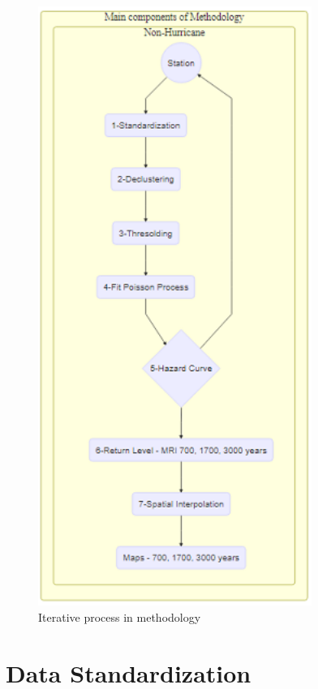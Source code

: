 \documentclass[12pt,oneside]{reedthesis}
\begin{document}
\footnotesize
\begin{figure}

{\centering \includegraphics[width=3.51in]{figure/main_methodology} 

}

\caption{Iterative process in methodology}\label{fig:mainmethodology}
\end{figure}
\normalsize

\hypertarget{data-standardization-1}{%
\section{Data Standardization}\label{data-standardization-1}}
\end{document}
